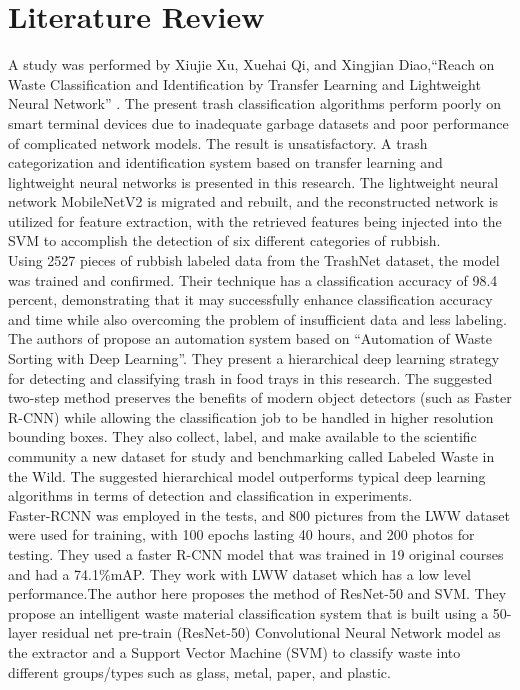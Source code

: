 \documentclass[conference]{IEEEtran}
\begin{document}
 \section{Literature Review}
A study was performed by Xiujie Xu, Xuehai Qi, and Xingjian Diao,``Reach on Waste Classification and Identification by Transfer Learning and Lightweight Neural Network” \cite{b4}. The present trash classification algorithms perform poorly on smart terminal devices due to inadequate garbage datasets and poor performance of complicated network models. The result is unsatisfactory. \cite{b14} A trash categorization and identification system based on transfer learning and lightweight neural networks is presented in this research. The lightweight neural network MobileNetV2 is migrated and rebuilt, and the reconstructed network is utilized for feature extraction, with the retrieved features being injected into the SVM to accomplish the detection of six different categories of rubbish.\vspace{1mm}\\
Using 2527 pieces of rubbish labeled data from the TrashNet dataset, the model was trained and confirmed. Their technique has a classification accuracy of 98.4 percent, demonstrating that it may successfully enhance classification accuracy and time while also overcoming the problem of insufficient data and less labeling.\vspace{1mm}\\
The authors of \cite{b5} propose an automation system based on “Automation of Waste Sorting with Deep Learning”. They present a hierarchical deep learning strategy for detecting and classifying trash in food trays in this research. The suggested two-step method preserves the benefits of modern object detectors (such as Faster R-CNN) while allowing the classification job to be handled in higher resolution bounding boxes. \cite{b15}They also collect, label, and make available to the scientific community a new dataset for study and benchmarking called Labeled Waste in the Wild. The suggested hierarchical model outperforms typical deep learning algorithms in terms of detection and classification in experiments.\vspace{1mm}\\
Faster-RCNN was employed in the tests, and 800 pictures from the LWW dataset were used for training, with 100 epochs lasting 40 hours, and 200 photos for testing. They used a faster R-CNN model that was trained in 19 original courses and had a 74.1\%mAP. They work with LWW dataset which has a low level performance.The author here \cite{b1} proposes the method of ResNet-50 and SVM. They propose an intelligent waste material classification system that is built using a 50-layer residual net pre-train (ResNet-50) \cite{b2} Convolutional Neural Network model as the extractor and a Support Vector Machine (SVM) to classify waste into different groups/types such as glass, metal, paper, and plastic.\vspace{1mm}\\
\end{document}
